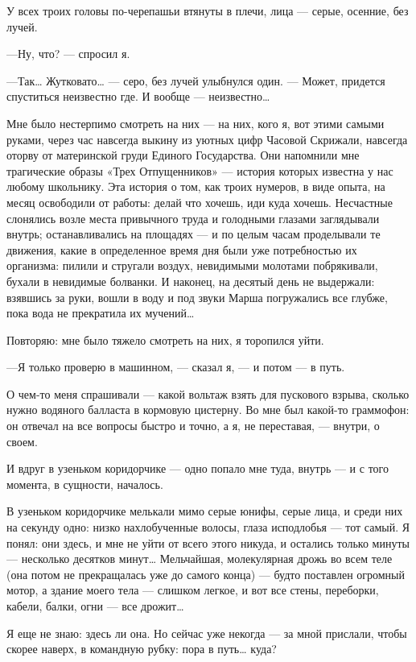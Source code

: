 \documentclass[11pt,openany]{book}
\begin{document}
У всех троих головы по-черепашьи втянуты в плечи, лица --- серые, осенние, без лучей.

---Ну, что? --- спросил я.

---Так\ldots{} Жутковато\ldots{} --- серо, без лучей улыбнулся один. --- Может, придется спуститься неизвестно где. И вообще --- неизвестно\ldots{}

Мне было нестерпимо смотреть на них --- на них, кого я, вот этими самыми руками, через час навсегда выкину из уютных цифр Часовой Скрижали, навсегда оторву от материнской груди Единого Государства. Они напомнили мне трагические образы «Трех Отпущенников» --- история которых известна у нас любому школьнику. Эта история о том, как троих нумеров, в виде опыта, на месяц освободили от работы: делай что хочешь, иди куда хочешь. Несчастные слонялись возле места привычного труда и голодными глазами заглядывали внутрь; останавливались на площадях --- и по целым часам проделывали те движения, какие в определенное время дня были уже потребностью их организма: пилили и стругали воздух, невидимыми молотами побрякивали, бухали в невидимые болванки. И наконец, на десятый день не выдержали: взявшись за руки, вошли в воду и под звуки Марша погружались все глубже, пока вода не прекратила их мучений\ldots{}

Повторяю: мне было тяжело смотреть на них, я торопился уйти.

---Я только проверю в машинном, --- сказал я, --- и потом --- в путь.

О чем-то меня спрашивали --- какой вольтаж взять для пускового взрыва, сколько нужно водяного балласта в кормовую цистерну. Во мне был какой-то граммофон: он отвечал на все вопросы быстро и точно, а я, не переставая, --- внутри, о своем.

И вдруг в узеньком коридорчике --- одно попало мне туда, внутрь --- и с того момента, в сущности, началось.

В узеньком коридорчике мелькали мимо серые юнифы, серые лица, и среди них на секунду одно: низко нахлобученные волосы, глаза исподлобья --- тот самый. Я понял: они здесь, и мне не уйти от всего этого никуда, и остались только минуты --- несколько десятков минут\ldots{} Мельчайшая, молекулярная дрожь во всем теле (она потом не прекращалась уже до самого конца) --- будто поставлен огромный мотор, а здание моего тела --- слишком легкое, и вот все стены, переборки, кабели, балки, огни --- все дрожит\ldots{}

Я еще не знаю: здесь ли она. Но сейчас уже некогда --- за мной прислали, чтобы скорее наверх, в командную рубку: пора в путь\ldots{} куда?
\end{document}
